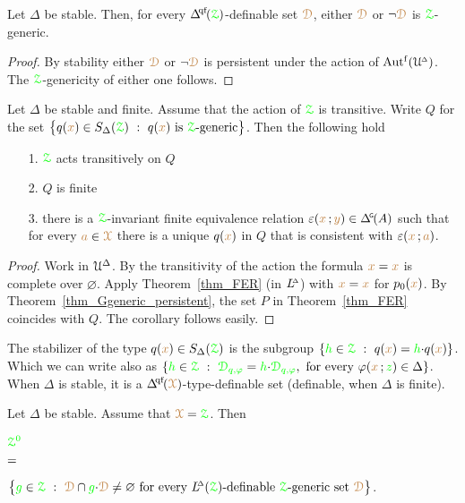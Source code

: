 \begin{corollary}\label{corol_genericornotgeneric}
  Let $\Delta$ be stable.
  Then, for every $\qfDelta(\grZ)$-definable set ${\color{brown}\EuScript D}$, either ${\color{brown}\EuScript D}$ or $\neg{\color{brown}\EuScript D}$ is ${\color{green}\EuScript Z}$-generic.
\end{corollary}

\begin{proof}
  By stability either ${\color{brown}\EuScript D}$ or $\neg{\color{brown}\EuScript D}$ is persistent under the action of $\mbox{Aut$^{\rm f}$}(\EuScript U\kern-.2ex^{\scriptscriptstyle\Delta})$.
  The ${\color{green}\EuScript Z}$-genericity of either one follows.
\end{proof}

\begin{corollary}\label{corol_feq_thm}
  Let $\Delta$ be stable and finite.
  Assume that the action of ${\color{green}\EuScript Z}$ is transitive.
  Write $Q$ for the set $\big\{q({\color{brown} x})\in S_\Delta({\color{green}\EuScript Z})\ :\ q({\color{brown} x})\textrm{ is }{\color{green}\EuScript Z}\textrm{-generic}\big\}$.
  Then the following hold
  \begin{itemize}
    \item [1.] ${\color{green}\EuScript Z}$ acts transitively on $Q$
    \item [2.] $Q$ is finite
    \item [3.] there is a ${\color{green}\EuScript Z}$-invariant finite equivalence relation $\epsilon({\mr x}\,;{\mr y})\in\GDelta(A)$ such that for every ${\color{brown} a}\in{\color{brown}\EuScript X}$ there is a unique $q({\color{brown} x})$ in $Q$ that is consistent with $\varepsilon({\color{brown} x}\,;{\color{brown} a})$.
  \end{itemize}
\end{corollary}

\begin{proof}
  Work in $\EuScript U^\Delta$.
  By the transitivity of the action the formula  ${\color{brown} x}={\color{brown} x}$ is complete over $\varnothing$.
  Apply Theorem~\ref{thm_FER} (in $L\kern-.5ex^{\scriptscriptstyle\Delta}$) with ${\color{brown} x}={\color{brown} x}$ for $p_0({\color{brown} x})$.
  By Theorem~\ref{thm_Ggeneric_persistent}, the set $P$ in Theorem~\ref{thm_FER} coincides with $Q$.
  The corollary follows easily.
\end{proof}

The stabilizer of the type $q({\color{brown} x})\in S_\Delta({\color{green}\EuScript Z})$ is the subgroup $\{{\color{green} h}\in{\color{green}\EuScript Z}\ :\ q({\color{brown} x})={\color{green} h}{\cdot}q({\color{brown} x})\}$.
Which we can write also as $\{{\gr h}\in\grZ\ :\ {\gr\D_{q,\phi}}={\gr h}{\cdot}{\gr\D_{q,\phi}},\textrm{ for every }\phi({\mr x}\,;{\gr z})\in\Delta\}$.
When $\Delta$ is stable, it is a $\qfDelta(\mrX)$-type-definable set (definable, when $\Delta$ is finite).

\def\medrel#1{\parbox[t]{6ex}{$\displaystyle\hfil #1$}}
\def\ceq#1#2#3{\parbox{5ex}{$\displaystyle #1$}\medrel{#2}$\displaystyle  #3$}
\begin{theorem}\label{thm_Z0_stable}
  Let $\Delta$ be stable.
  Assume that ${\color{brown}\EuScript X}={\color{green}\EuScript Z}$.
  Then
  
  \ceq{\hfill{\gr\Z^0}}{=}{\big\{{\gr g}\in\grZ\ :\ \mrD\cap{\gr g}{\cdot}\mrD\neq\varnothing\textrm{ for every }\LDelta(\grZ)\textrm{-definable }\grZ\textrm{-generic set }\mrD\big\}}.
  
\end{theorem}


